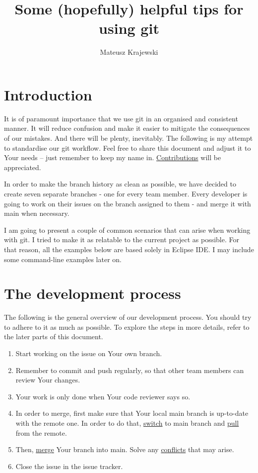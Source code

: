 \documentclass{article}
\title{Some (hopefully) helpful tips for using git}
\author{Mateusz Krajewski}
\begin{document}
\maketitle
\tableofcontents
\newpage

\section{Introduction} 
It is of paramount importance that we use git in an organised and consistent manner. It will reduce confusion and make it easier to mitigate the consequences of our mistakes. And there will be plenty, inevitably. The following is my attempt to standardise our git workflow. Feel free to share this document and adjust it to Your needs -- just remember to keep my name in. \hyperref[sec:contributing]{Contributions} will be appreciated.

In order to make the branch history as clean as possible, we have decided to create seven separate branches - one for every team member. Every developer is going to work on their issues on the branch assigned to them - and merge it with main when necessary.

I am going to present a couple of common scenarios that can arise when working with git. I tried to make it as relatable to the current project as possible. For that reason, all the examples below are based solely in Eclipse IDE. I may include some command-line examples later on.

\section{The development process}

The following is the general overview of our development process. You should try to adhere to it as much as possible. To explore the steps in more details, refer to the later parts of this document.

\begin{enumerate}
	\item Start working on the issue on Your own branch.
	\item Remember to commit and push regularly, so that other team members can review Your changes.
	\item Your work is only done when Your code reviewer says so.
	\item In order to merge, first make sure that Your local main branch is up-to-date with the remote one. In order to do that, \hyperref[sec:switching]{switch} to main branch and \hyperref[sec:pulling]{pull} from the remote.
	\item Then, \hyperref[sec:merging]{merge} Your branch into main. Solve any \hyperref[sec:conflicts]{conflicts} that may arise.
	\item Close the issue in the issue tracker.
\end{enumerate}
\end{document}

